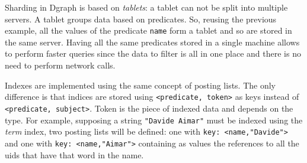 Sharding in Dgraph is based on \textit{tablets}: a tablet can not be split into multiple servers. A tablet groups data based on predicates. So, reusing the previous example, all the values of the predicate \lstinline{name} form a tablet and so are stored in the same server. Having all the same predicates stored in a single machine allows to perform faster queries since the data to filter is all in one place and there is no need to perform network calls.

Indexes are implemented using the same concept of posting lists. The only difference is that indices are stored using \lstinline{<predicate, token>} as keys instead of \lstinline{<predicate, subject>}. Token is the piece of indexed data and depends on the type. For example, supposing a string \lstinline{"Davide Aimar"} must be indexed using the \textit{term} index, two posting lists will be defined: one with \lstinline{key: <name,"Davide">} and one with \lstinline{key: <name,"Aimar">} containing as values the references to all the uids that have that word in the name.



